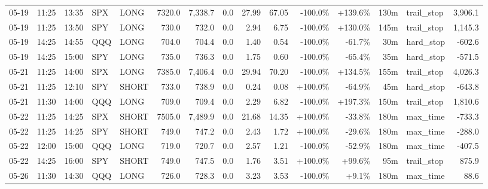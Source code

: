 \documentclass[11pt,a4paper,twoside]{article}
\begin{document}
\begin{landscape}
\begin{center}
\begin{longtable}{>{\color{txtmain}}l l l l l r r r r r r r r >{\color{txtmain}}l r}
05-19 & 11:25 & 13:35 & SPX & LONG & 7320.0 & 7,338.7 & 0.0 & 27.99 & 67.05 & \textcolor{lossred}{-100.0\%} & \textcolor{wingreen}{+139.6\%} & 130m & trail\_stop & \textcolor{wingreen}{3,906.1} \\
05-19 & 11:25 & 13:50 & SPY & LONG & 730.0 & 732.0 & 0.0 & 2.94 & 6.75 & \textcolor{lossred}{-100.0\%} & \textcolor{wingreen}{+130.0\%} & 145m & trail\_stop & \textcolor{wingreen}{1,145.3} \\
05-19 & 14:25 & 14:55 & QQQ & LONG & 704.0 & 704.4 & 0.0 & 1.40 & 0.54 & \textcolor{lossred}{-100.0\%} & \textcolor{lossred}{-61.7\%} & 30m & hard\_stop & \textcolor{lossred}{-602.6} \\
05-19 & 14:25 & 15:00 & SPY & LONG & 735.0 & 736.3 & 0.0 & 1.75 & 0.60 & \textcolor{lossred}{-100.0\%} & \textcolor{lossred}{-65.4\%} & 35m & hard\_stop & \textcolor{lossred}{-571.5} \\
05-21 & 11:25 & 14:00 & SPX & LONG & 7385.0 & 7,406.4 & 0.0 & 29.94 & 70.20 & \textcolor{lossred}{-100.0\%} & \textcolor{wingreen}{+134.5\%} & 155m & trail\_stop & \textcolor{wingreen}{4,026.3} \\
05-21 & 11:25 & 12:10 & SPY & SHORT & 733.0 & 738.9 & 0.0 & 0.24 & 0.08 & \textcolor{wingreen}{+100.0\%} & \textcolor{lossred}{-64.9\%} & 45m & hard\_stop & \textcolor{lossred}{-643.8} \\
05-21 & 11:30 & 14:00 & QQQ & LONG & 709.0 & 709.4 & 0.0 & 2.29 & 6.82 & \textcolor{lossred}{-100.0\%} & \textcolor{wingreen}{+197.3\%} & 150m & trail\_stop & \textcolor{wingreen}{1,810.6} \\
05-22 & 11:25 & 14:25 & SPX & SHORT & 7505.0 & 7,489.9 & 0.0 & 21.68 & 14.35 & \textcolor{wingreen}{+100.0\%} & \textcolor{lossred}{-33.8\%} & 180m & max\_time & \textcolor{lossred}{-733.3} \\
05-22 & 11:25 & 14:25 & SPY & SHORT & 749.0 & 747.2 & 0.0 & 2.43 & 1.72 & \textcolor{wingreen}{+100.0\%} & \textcolor{lossred}{-29.6\%} & 180m & max\_time & \textcolor{lossred}{-288.0} \\
05-22 & 12:00 & 15:00 & QQQ & LONG & 719.0 & 720.7 & 0.0 & 2.57 & 1.21 & \textcolor{lossred}{-100.0\%} & \textcolor{lossred}{-52.9\%} & 180m & max\_time & \textcolor{lossred}{-407.5} \\
05-22 & 14:25 & 16:00 & SPY & SHORT & 749.0 & 747.5 & 0.0 & 1.76 & 3.51 & \textcolor{wingreen}{+100.0\%} & \textcolor{wingreen}{+99.6\%} & 95m & trail\_stop & \textcolor{wingreen}{875.9} \\
05-26 & 11:30 & 14:30 & QQQ & LONG & 726.0 & 728.3 & 0.0 & 3.23 & 3.53 & \textcolor{lossred}{-100.0\%} & \textcolor{wingreen}{+9.1\%} & 180m & max\_time & \textcolor{wingreen}{88.6} \\

\end{longtable}
\end{center}
\end{landscape}
\end{document}
